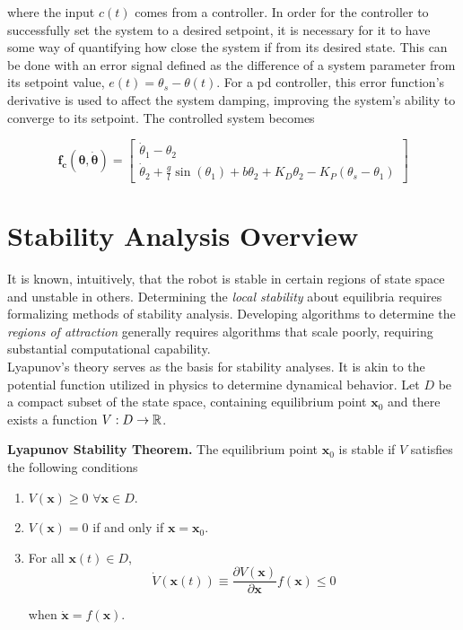 where the input $c(t)$ comes from a controller. In order for the controller to successfully set the system to a desired setpoint, it is necessary for it to have some way of quantifying how close the system if from its desired state. This can be done with an error signal defined as the difference of a system parameter from its setpoint value, $e(t)=\theta_s - \theta(t)$.  For a \gls{pd} controller, this error function's derivative is used to affect the system damping, improving the system's ability to converge to its setpoint. The controlled system becomes


\begin{equation}
    \bm{f_c}\left( {\bm{\theta} ,\dot{\bm{\theta}} } \right) = \left[ {\begin{array}{*{20}{c}}
  {{{\dot \theta }_1} - {\theta _2}} \\ 
  {{{\dot \theta }_2} + \frac{g}{l}\sin \left( {{\theta _1}} \right) + b \theta_2 + {K_D}{\theta _2} - {K_P}\left( {{\theta _s} - {\theta _1}} \right)} 
\end{array}} \right]
\end{equation}

\section{Stability Analysis Overview}

It is known, intuitively, that the robot is stable in certain regions of state space and unstable in others. Determining the \textit{local stability} about equilibria requires formalizing methods of stability analysis. Developing algorithms to determine the \textit{regions of attraction} generally requires algorithms that scale poorly, requiring substantial computational capability. \\

Lyapunov's theory serves as the basis for stability analyses. It is akin to the potential function utilized in physics to determine dynamical behavior. Let $D$ be a compact subset of the state space, containing equilibrium point $\bm{x}_0$ and there exists a function $V:D \rightarrow \mathbb{R}$. 

\begin{thm}
\textbf{Lyapunov Stability Theorem.} The equilibrium point  $\bm{x}_0$ is stable if $V$ satisfies the following conditions

\begin{enumerate}
    \item $V(\bm{x}) \ge 0$ $\forall \bm{x} \in D$.
    \item $V(\bm{x}) =0$ if and only if $\bm{x} = \bm{x}_0$.
    \item For all $\bm{x}(t) \in D$,
    \begin{equation}
        \dot{V}(\bm{x}(t)) \equiv \frac{\partial V(\bm{x})}{\partial \bm{x}} f(\bm{x}) \le 0
    \end{equation}
    
    when $\bm{\dot{x}} = f(\bm{x})$.
\end{enumerate}
\end{thm}

